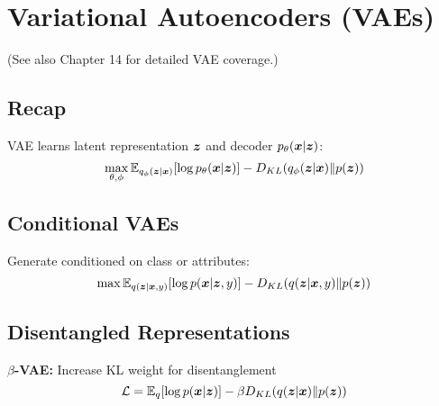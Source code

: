 
\section{Variational Autoencoders (VAEs) }
\label{sec:vaes}

(See also Chapter 14 for detailed VAE coverage.)

\subsection{Recap}

VAE learns latent representation $\boldsymbol{z}$ and decoder $p_{\theta}(\boldsymbol{x}|\boldsymbol{z})$:
\begin{equation}
\max_{\theta, \phi} \mathbb{E}_{q_{\phi}(\boldsymbol{z}|\boldsymbol{x})}[\log p_{\theta}(\boldsymbol{x}|\boldsymbol{z})] - D_{KL}(q_{\phi}(\boldsymbol{z}|\boldsymbol{x}) \| p(\boldsymbol{z}))
\end{equation}

\subsection{Conditional VAEs}

Generate conditioned on class or attributes:
\begin{equation}
\max \mathbb{E}_{q(\boldsymbol{z}|\boldsymbol{x}, y)}[\log p(\boldsymbol{x}|\boldsymbol{z}, y)] - D_{KL}(q(\boldsymbol{z}|\boldsymbol{x}, y) \| p(\boldsymbol{z}))
\end{equation}

\subsection{Disentangled Representations}

\textbf{$\beta$-VAE:} Increase KL weight for disentanglement
\begin{equation}
\mathcal{L} = \mathbb{E}_{q}[\log p(\boldsymbol{x}|\boldsymbol{z})] - \beta D_{KL}(q(\boldsymbol{z}|\boldsymbol{x}) \| p(\boldsymbol{z}))
\end{equation}





